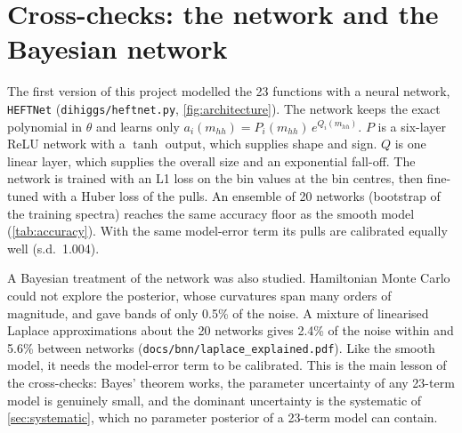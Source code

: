 \documentclass[11pt]{article}
\newcommand{\file}[1]{\nolinkurl{#1}}
\newcommand{\mhh}{m_{hh}}
\newcommand{\code}[1]{\texttt{#1}}
\begin{document}
\section{Cross-checks: the network and the Bayesian network}
\label{sec:crosscheck}

The first version of this project modelled the 23 functions with a neural network,
\code{HEFTNet} (\file{dihiggs/heftnet.py}, \cref{fig:architecture}). The network keeps the exact
polynomial in $\theta$ and learns only $a_i(\mhh) = P_i(\mhh)\,e^{Q_i(\mhh)}$. $P$ is a six-layer
ReLU network with a $\tanh$ output, which supplies shape and sign. $Q$ is one linear layer,
which supplies the overall size and an exponential fall-off. The network is trained with an
L1 loss on the bin values at the bin centres, then fine-tuned with a Huber loss of the pulls.
An ensemble of 20 networks (bootstrap of the training spectra) reaches the same accuracy floor
as the smooth model (\cref{tab:accuracy}). With the same model-error term its pulls are
calibrated equally well (s.d.\ 1.004).

A Bayesian treatment of the network was also studied. Hamiltonian Monte Carlo could not explore
the posterior, whose curvatures span many orders of magnitude, and gave bands of only 0.5\% of
the noise. A mixture of linearised Laplace approximations about the 20 networks gives 2.4\% of
the noise within and 5.6\% between networks (\file{docs/bnn/laplace_explained.pdf}). Like the
smooth model, it needs the model-error term to be calibrated. This is the main lesson of the
cross-checks: Bayes' theorem works, the parameter uncertainty of any 23-term model is genuinely
small, and the dominant uncertainty is the systematic of \cref{sec:systematic}, which no
parameter posterior of a 23-term model can contain.
\end{document}
